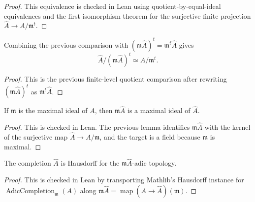 \begin{proof}
  This equivalence is checked in Lean using quotient-by-equal-ideal
  equivalences and the first isomorphism theorem for the surjective finite
  projection \(\widehat A\to A/\mathfrak m^t\).
\end{proof}

\begin{definition}
  \label{def:adic_completion_quotient_power_equiv}
  Combining the previous comparison with
  \((\mathfrak m\widehat A)^t=\mathfrak m^t\widehat A\) gives
  \[
    \widehat A/(\mathfrak m\widehat A)^t \simeq A/\mathfrak m^t.
  \]
\end{definition}

\begin{proof}
  This is the previous finite-level quotient comparison after rewriting
  \((\mathfrak m\widehat A)^t\) as \(\mathfrak m^t\widehat A\).
\end{proof}

\begin{lemma}
  \label{lem:adic_completion_power_image_one_is_maximal}
  If \(\mathfrak m\) is the maximal ideal of \(A\), then
  \(\mathfrak m\widehat A\) is a maximal ideal of \(\widehat A\).
\end{lemma}

\begin{proof}
  This is checked in Lean.  The previous lemma identifies
  \(\mathfrak m\widehat A\) with the kernel of the surjective map
  \(\widehat A\to A/\mathfrak m\), and the target is a field because
  \(\mathfrak m\) is maximal.
\end{proof}

\begin{lemma}
  \label{lem:adic_completion_power_image_one_is_hausdorff}
  The completion \(\widehat A\) is Hausdorff for the
  \(\mathfrak m\widehat A\)-adic topology.
\end{lemma}

\begin{proof}
  This is checked in Lean by transporting Mathlib's Hausdorff instance for
  \(\operatorname{AdicCompletion}_{\mathfrak m}(A)\) along
  \(\mathfrak m\widehat A=\operatorname{map}(A\to\widehat A)(\mathfrak m)\).
\end{proof}

